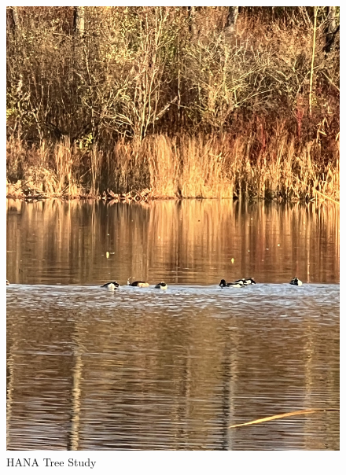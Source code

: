 \documentclass{article}
\begin{document}
\begin{figure}[h!]
\centering
\includegraphics[scale=.1]{Research/HANA/NOV2024/IMG_9811.JPG}
\caption{HANA Tree Study}
\label{fig:HANA}
\end{figure}
\end{document}
